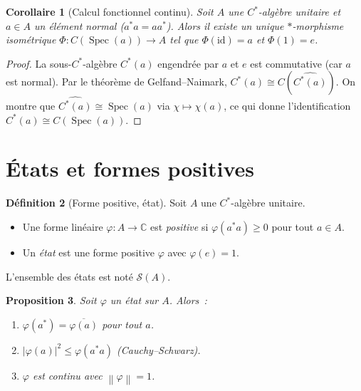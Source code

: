 \documentclass[a4paper,12pt]{book}
\DeclareMathOperator{\Spec}{Spec}
\newcommand{\C}{\mathbb{C}}
\newcommand{\norm}[1]{\left\| #1 \right\|}
\newcommand{\abs}[1]{\left| #1 \right|}
\theoremstyle{definition}
\newtheorem{definition}{Définition}[chapter]
\theoremstyle{plain}
\newtheorem{proposition}[definition]{Proposition}
\newtheorem{corollaire}[definition]{Corollaire}
\theoremstyle{remark}
\begin{document}
\begin{corollaire}[Calcul fonctionnel continu]
\label{cor:calcul-fonctionnel-cstar}
Soit $A$ une $C^*$-algèbre unitaire et $a \in A$ un élément normal ($a^*a = aa^*$). Alors
il existe un unique $*$-morphisme isométrique
$\Phi : C(\Spec(a)) \to A$ tel que $\Phi(\mathrm{id}) = a$ et $\Phi(1) = e$.
\end{corollaire}

\begin{proof}
La sous-$C^*$-algèbre $C^*(a)$ engendrée par $a$ et $e$ est commutative (car $a$ est
normal). Par le théorème de Gelfand--Naimark, $C^*(a) \cong C(\widehat{C^*(a)})$. On
montre que $\widehat{C^*(a)} \cong \Spec(a)$ via $\chi \mapsto \chi(a)$, ce qui donne
l'identification $C^*(a) \cong C(\Spec(a))$.
\end{proof}

\section{États et formes positives}

\begin{definition}[Forme positive, état]
\label{def:etat}
Soit $A$ une $C^*$-algèbre unitaire.
\begin{itemize}
  \item Une forme linéaire $\varphi : A \to \C$ est \emph{positive} si
        $\varphi(a^*a) \ge 0$ pour tout $a \in A$.
  \item Un \emph{état} est une forme positive $\varphi$ avec $\varphi(e) = 1$.
\end{itemize}
L'ensemble des états est noté $\mathcal{S}(A)$.
\end{definition}

\begin{proposition}
\label{prop:etat-proprietes}
Soit $\varphi$ un état sur $A$. Alors~:
\begin{enumerate}[label=(\roman*)]
  \item $\varphi(a^*) = \overline{\varphi(a)}$ pour tout $a$.
  \item $\abs{\varphi(a)}^2 \le \varphi(a^*a)$ (Cauchy--Schwarz).
  \item $\varphi$ est continu avec $\norm{\varphi} = 1$.
\end{enumerate}
\end{proposition}
\end{document}
